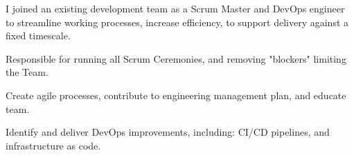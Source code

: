 {}
I joined an existing development team as a Scrum Master and DevOps engineer to streamline working processes, increase efficiency, to support delivery against a fixed timescale.
\vspace{0.25em}
\begin{tightemize}
  \item Responsible for running all Scrum Ceremonies, and removing "blockers" limiting the Team.
  \item Create agile processes, contribute to engineering management plan, and educate team.
  \item Identify and deliver DevOps improvements, including: CI/CD pipelines, and infrastructure as code.
\end{tightemize}
\sectionsep
